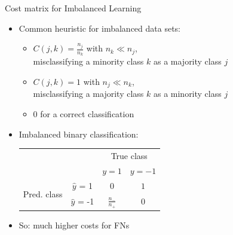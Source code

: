 \documentclass[11pt,compress,t,notes=noshow, aspectratio=169, xcolor=table]{beamer}
\begin{document}
\begin{frame}{Cost matrix for Imbalanced Learning}
		\begin{itemize}			
	 
			\item Common heuristic for imbalanced data sets: 
	
			\begin{itemize}
                \item $C(j,k) = \frac{n_j}{n_k}$ with $n_k  \ll n_j$,\\
                misclassifying a minority class $k$ as a majority class $j$
		
				\item $C(j,k) = 1$ with $n_j \ll n_k$,\\
    misclassifying a majority class $k$ as a minority class $j$
			
				\item 0 for a correct classification 
			
			\end{itemize}
\vspace{1cm}
    		\item Imbalanced binary classification: \\
            \begin{table}[]
                \centering
                \begin{tabular}{cc|cc}
                    & &\multicolumn{2}{c}{True class} \\
                    & & $y=1$ & $y=-1$  \\
                    \hline
                    \multirow{2}{*}{\parbox{0.5cm}{Pred. class}}& $\hat y$ = 1     & $0$                & $ 1 $\\
                    & $\hat y$ = -1 & $ \frac{n_-}{n_+} $              &  $0$   \\
                \end{tabular}
            \end{table}
    		

            \item So: much higher costs for FNs
        \end{itemize}
		
\end{frame}
\end{document}
